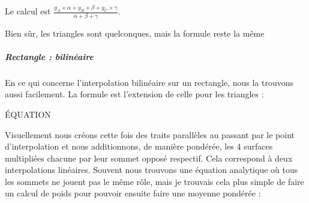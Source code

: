 \begin{center}
    
\end{center}

Le calcul est \( \frac{y_A \times \alpha + y_B \times \beta + y_C \times \gamma}{\alpha + \beta + \gamma} \).

Bien sûr, les triangles sont quelconques, mais la formule reste la même

\subparagraph{Rectangle : bilinéaire}

En ce qui concerne l'interpolation bilinéaire sur un rectangle, nous la trouvons aussi facilement. La formule est l'extension de celle pour les triangles :

ÉQUATION

Visuellement nous créons cette fois des traits parallèles au passant par le point d'interpolation et nous additionnons, de manière pondérée, les 4 surfaces multipliées chacune par leur sommet opposé respectif. Cela correspond à deux interpolations linéaires. Souvent nous trouvons une équation analytique où tous les sommets ne jouent pas le même rôle, mais je trouvais cela plus simple de faire un calcul de poids pour pouvoir ensuite faire une moyenne pondérée :


